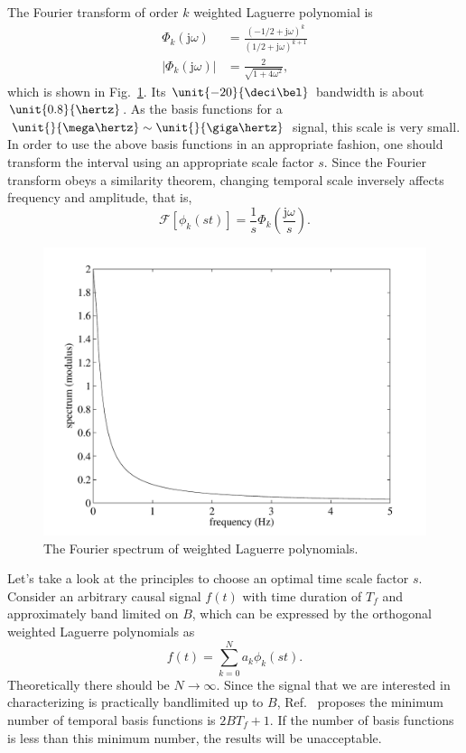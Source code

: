 \documentclass[conference, a4paper]{IEEEtran}
\begin{document}
The Fourier transform of order $k$ weighted Laguerre polynomial is
\begin{equation}
\begin{split}
\Phi_k(\mathrm{j}\omega)&=\frac{(-1/2+\mathrm{j}\omega)^k}{(1/2+\mathrm{j}\omega)^{k+1}}\\
\lvert{\Phi_k(\mathrm{j}\omega)}\rvert&=\frac{2}{\sqrt{1+4\omega^2}},
\end{split}
\end{equation}
which is shown in Fig.~\ref{fig1}. Its $\unit{-20}{\deci\bel}$
bandwidth is about $\unit{0.8}{\hertz}$. As the basis functions for a
$\unit{}{\mega\hertz}\sim\unit{}{\giga\hertz}$ signal, this scale is very
small. In order to use the above basis functions in an appropriate
fashion, one should transform the interval using an appropriate scale
factor $s$. Since the Fourier transform obeys a similarity theorem,
changing temporal scale inversely affects frequency and amplitude, that is,
\begin{equation}
\mathscr{F}[\phi_k(st)]=\frac{1}{s}\Phi_k(\frac{\mathrm{j}\omega}{s}).
\end{equation}
\begin{figure}
    \centering
    \includegraphics[scale=0.48]{lagu.pdf}
    \caption{The Fourier spectrum of weighted Laguerre polynomials.}
    \label{fig1}
\end{figure}

Let's take a look at the principles to choose an optimal time scale factor
$s$. Consider an arbitrary causal signal $f(t)$ with time duration of $T_f$
and approximately band limited on $B$, which can be expressed by the
orthogonal weighted Laguerre polynomials as
\begin{equation}
f(t)=\sum_{k=0}^{N}a_k\phi_k(st).
\end{equation}
Theoretically there should be $N\rightarrow\infty$. Since the signal that
we are interested in characterizing is practically bandlimited up to
$B$, Ref.~\cite{jung:time:2003} proposes the minimum number of temporal basis
functions is $2BT_f+1$. If the number of basis functions is less than
this minimum number, the results will be unacceptable.
\end{document}
